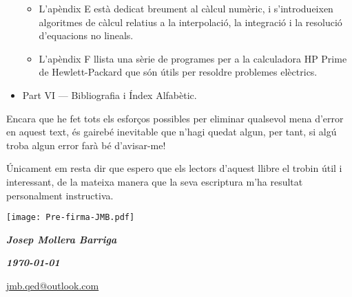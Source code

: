 \begin{itemize}
\begin{itemize}
			\item L'apèndix E està dedicat breument al càlcul numèric, i s'introdueixen algoritmes de càlcul relatius a la interpolació, la integració i la resolució d'equacions no lineals.
			\item L'apèndix F llista una sèrie de programes per a la calculadora \textsf{HP Prime} de Hewlett-Packard que són útils per resoldre problemes elèctrics. 
		\end{itemize}
		\item Part VI --- Bibliografia i  Índex Alfabètic.
	\end{itemize}
		

    Encara que he fet tots els esforços possibles per eliminar qualsevol
    mena  d'error en aquest text, és gairebé inevitable que n'hagi quedat algun,
    per tant, si algú troba algun error farà bé d'avisar-me!


   Únicament em resta dir que espero que els lectors d'aquest llibre el trobin    útil i interessant, de la mateixa manera que la seva escriptura m'ha resultat  personalment instructiva.


\hfill
\begin{minipage}[b]{35mm}
    \texttt{[image: Pre-firma-JMB.pdf]}
\end{minipage}

{\large

    \hfill \textbf{\textsl{Josep Mollera Barriga}}

    \hfill \textbf{\textsl{\today}}

    \hfill {\small \href{mailto:jmb.qed@outlook.com}{\faEnvelope\hspace{2mm}jmb.qed@outlook.com} }

}

